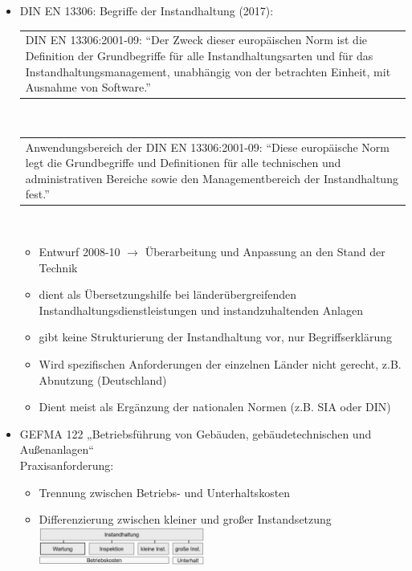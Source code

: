 \documentclass[fleqn,twoside,dvipsnames]{article}
\begin{document}
\begin{itemize}
            \item DIN EN 13306: Begriffe der Instandhaltung (2017):\\
                \begin{tabular}{|p{13cm}} DIN EN 13306:2001-09: \enquote{Der Zweck dieser europäischen Norm ist die Definition der Grundbegriffe für alle Instandhaltungsarten und für das Instandhaltungsmanagement, unabhängig von der betrachten Einheit, mit Ausnahme von Software.} \end{tabular}\vspace{1.5mm}\\
                \begin{tabular}{|p{13cm}} Anwendungsbereich der DIN EN 13306:2001-09: \enquote{Diese europäische Norm legt die Grundbegriffe und Definitionen für alle technischen und administrativen Bereiche sowie den Managementbereich der Instandhaltung fest.} \end{tabular}\\
                \begin{itemize}
                    \item Entwurf 2008-10 $\rightarrow$ Überarbeitung und Anpassung an den Stand der Technik
                    \item dient als Übersetzungshilfe bei länderübergreifenden Instandhaltungsdienstleistungen und instandzuhaltenden Anlagen
                    \item gibt keine Strukturierung der Instandhaltung vor, nur Begriffserklärung
                    \item Wird spezifischen Anforderungen der einzelnen Länder nicht gerecht, z.B. Abnutzung (Deutschland)
                    \item Dient meist als Ergänzung der nationalen Normen (z.B. SIA oder DIN)
                \end{itemize}
            \item GEFMA 122 „Betriebsführung von Gebäuden, gebäudetechnischen und Außenanlagen“ \\Praxisanforderung:
                \begin{itemize}
                    \item Trennung zwischen Betriebs- und Unterhaltskosten
                    \item Differenzierung zwischen kleiner und großer Instandsetzung\\
                    \includegraphics[width=0.45\textwidth]{Grafiken/Instandhaltung/GEFMA 122 Instandhaltung.png}

\end{itemize}
\end{itemize}
\end{document}
